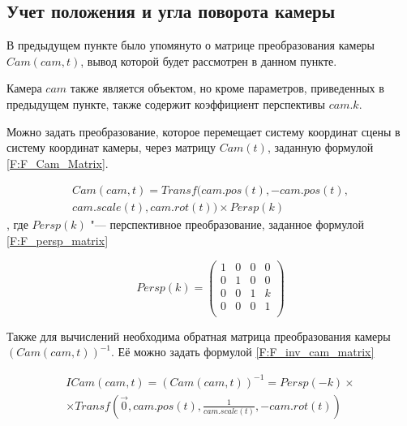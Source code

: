 \subsection{Учет положения и угла поворота камеры}
В предыдущем пункте было упомянуто о матрице преобразования камеры $Cam(cam, t)$, вывод которой будет рассмотрен в данном пункте.

Камера $cam$ также является объектом, но кроме параметров, приведенных в предыдущем пункте, также содержит коэффициент перспективы $cam.k$.

Можно задать преобразование, которое перемещает систему координат сцены в систему координат камеры, через матрицу $Cam(t)$, заданную формулой \eqref{F:F_Cam_Matrix}.

\begin{eqndesc}
    \begin{equation}
        \label{F:F_Cam_Matrix}
        \begin{matrix}
            {Cam(cam, t) = Transf(cam.pos(t), -cam.pos(t),} \\{ cam.scale(t), cam.rot(t)) \times Persp(k)}
        \end{matrix}
    \end{equation}
    , где
    $Persp(k)$ "--- перспективное преобразование, заданное формулой \eqref{F:F_persp_matrix}\\
\end{eqndesc}

\begin{equation}
    \label{F:F_persp_matrix}
    Persp(k) = \begin{pmatrix}
        1 & 0 & 0 & 0 \\
        0 & 1 & 0 & 0 \\
        0 & 0 & 1 & k \\
        0 & 0 & 0 & 1 \\
    \end{pmatrix}
\end{equation}

Также для вычислений необходима обратная матрица преобразования камеры $(Cam(cam, t))^{-1}$. Её можно задать формулой \eqref{F:F_inv_cam_matrix}

\begin{equation}
    \label{F:F_inv_cam_matrix}
    \begin{matrix}
        {ICam(cam, t) = (Cam(cam, t))^{-1} = Persp(-k) \times} \\
        {\times Transf(\vec{0}, cam.pos(t), \frac{1}{cam.scale(t)}, -cam.rot(t))}
    \end{matrix}
\end{equation}

